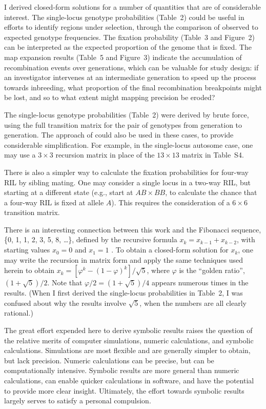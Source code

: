 \documentclass[12pt,letterpaper]{article}
\begin{document}
I derived closed-form solutions for a number
of quantities that are of considerable interest. The single-locus genotype
probabilities (Table~2) could be useful in efforts to identify regions under
selection, through the comparison of observed to expected genotype
frequencies.  The fixation probability (Table~3 and
Figure~2) can be interpreted as the expected proportion of the genome
that is fixed.  The map
expansion results (Table~5 and Figure~3) indicate the accumulation of recombination events
over generations, which can be valuable for study design:
if an investigator intervenes at an
intermediate generation to speed up the process towards inbreeding,
what proportion of the final recombination breakpoints might be lost, and
so to what extent might mapping precision be eroded?

The single-locus genotype probabilities (Table~2) were derived by
brute force, using the full transition matrix for the pair of
genotypes from generation to generation.  The approach of
\citet{Kimura1963} could also be used in these cases, to provide
considerable simplification.  For example, in the single-locus
autosome case, one may use a $3 \times 3$ recursion matrix in place of
the $13 \times 13$ matrix in Table~S4. 

There is also a simpler way to calculate the fixation probabilities
for four-way RIL by sibling mating.  One may consider a single locus
in a two-way RIL, but starting at a different state (e.g., start at $AB \times
BB$, to calculate the chance that a four-way RIL is fixed at allele
$A$).  This requires the consideration of a $6 \times 6$ transition
matrix.

There is an interesting connection between this work and the Fibonacci
sequence, \{0, 1, 1, 2, 3, 5, 8, \dots\}, defined by the recursive formula
$x_k = x_{k-1} + x_{k-2}$, with starting values $x_0=0$ and $x_1=1$
\citep[see][Sec. 6.6]{Graham1994}.  To obtain a closed-form solution
for $x_k$, one may write the recursion in matrix form and apply the
same techniques used herein to obtain $x_k = [\varphi^k -
  (1-\varphi)^k]/\sqrt{5}$, where $\varphi$ is the ``golden ratio'',
$(1 + \sqrt{5})/2$.  Note that $\varphi/2 = (1 + \sqrt{5})/4$ appears
numerous times in the results.  (When I first derived the single-locus
probabilities in Table~2, I was confused about why the results
involve $\sqrt{5}$, when the numbers are all clearly rational.)

The great effort expended here to derive symbolic
results raises the question of the relative merits of computer
simulations, numeric calculations, and symbolic calculations.
Simulations are most flexible and are generally simpler to obtain, but
lack precision.  Numeric calculations can be precise, but can be
computationally intensive.  Symbolic results are more general than
numeric calculations, can enable quicker calculations in software, and
have the potential to provide more clear insight. 
Ultimately, the effort towards symbolic results largely
serves to satisfy a personal compulsion.
\end{document}
